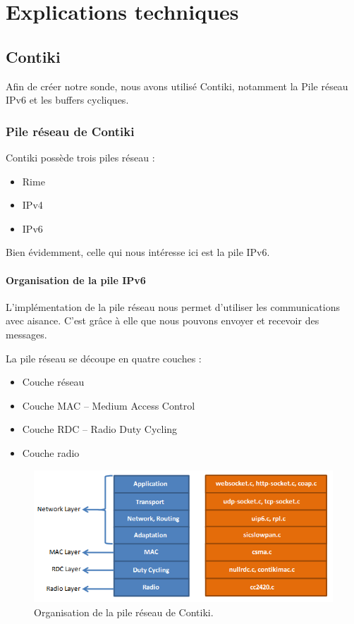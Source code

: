 \chapter{Explications techniques}
\label{sec:technique}

\section{Contiki}

	Afin de créer notre sonde, nous avons utilisé Contiki, notamment la Pile réseau IPv6 et les buffers cycliques.
	
	\subsection{Pile réseau de Contiki}
	
		Contiki possède trois piles réseau :
		\begin{itemize}
			\item Rime
			\item IPv4
			\item IPv6
		\end{itemize}
		Bien évidemment, celle qui nous intéresse ici est la pile IPv6. 
		
		\subsubsection{Organisation de la pile IPv6}
			
			L'implémentation de la pile réseau nous permet d'utiliser les communications avec aisance. C'est grâce à elle que nous pouvons envoyer et recevoir des messages.
			
			La pile réseau se découpe en quatre couches :
			\begin{itemize}
				\item Couche réseau
				\item Couche MAC -- Medium Access Control
				\item Couche RDC -- Radio Duty Cycling
				\item Couche radio
			\end{itemize}
			
			\clearpage
			
			\begin{figure}[htp]
				\centering
				\includegraphics[width=16cm]{images/Contikinetstack}
				\caption{Organisation de la pile réseau de Contiki.}
				\label{fig:contikinetstack}
			\end{figure}
			

